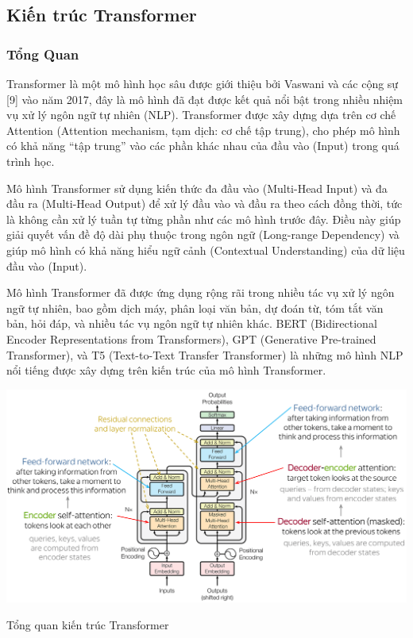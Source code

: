 \documentclass[a4paper, 12pt, openany]{book}
\begin{document}
\subsection{Kiến trúc Transformer}
\subsubsection{Tổng Quan}

Transformer\cite{Wolf2019HuggingFacesTS} là một mô hình học sâu được giới thiệu bởi Vaswani và các cộng sự [9]
vào năm 2017, đây là mô hình đã đạt được kết quả nổi bật trong nhiều nhiệm vụ xử lý
ngôn ngữ tự nhiên (NLP). Transformer được xây dựng dựa trên cơ chế Attention
(Attention mechanism, tạm dịch: cơ chế tập trung), cho phép mô hình có khả năng “tập
trung” vào các phần khác nhau của đầu vào (Input) trong quá trình học.

Mô hình Transformer sử dụng kiến thức đa đầu vào (Multi-Head Input) và đa đầu
ra (Multi-Head Output) để xử lý đầu vào và đầu ra theo cách đồng thời, tức là không cần
xử lý tuần tự từng phần như các mô hình trước đây. Điều này giúp giải quyết vấn đề độ
dài phụ thuộc trong ngôn ngữ (Long-range Dependency) và giúp mô hình có khả năng
hiểu ngữ cảnh (Contextual Understanding) của dữ liệu đầu vào (Input).

Mô hình Transformer đã được ứng dụng rộng rãi trong nhiều tác vụ xử lý ngôn ngữ
tự nhiên, bao gồm dịch máy, phân loại văn bản, dự đoán từ, tóm tắt văn bản, hỏi đáp, và
nhiều tác vụ ngôn ngữ tự nhiên khác. BERT\cite{BERT} (Bidirectional Encoder Representations from
Transformers), GPT\cite{yenduri2023generative} (Generative Pre-trained Transformer), và T5\cite{raffel2023exploring} (Text-to-Text Transfer
Transformer) là những mô hình NLP nổi tiếng được xây dựng trên kiến trúc của mô hình
Transformer.

\begin{minipage}{\linewidth}
    \captionsetup{type=figure}
    \centering
    \includegraphics[width=\linewidth]{./assets/images/transformer.png}
    \caption{Tổng quan kiến trúc Transformer}
\end{minipage}
\end{document}
